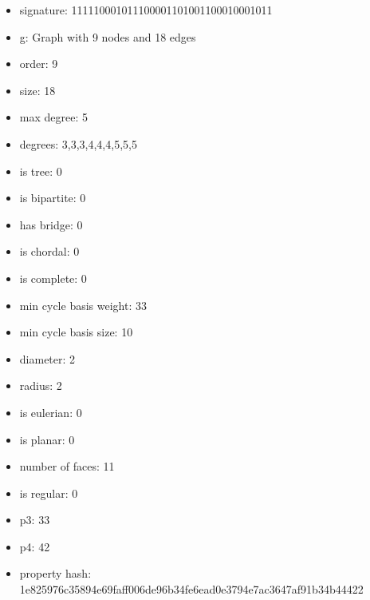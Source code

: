 \newpage
\begin{figure}
\end{figure}
\begin{itemize}
\item signature: 111110001011100001101001100010001011
\item g: Graph with 9 nodes and 18 edges
\item order: 9
\item size: 18
\item max degree: 5
\item degrees: 3,3,3,4,4,4,5,5,5
\item is tree: 0
\item is bipartite: 0
\item has bridge: 0
\item is chordal: 0
\item is complete: 0
\item min cycle basis weight: 33
\item min cycle basis size: 10
\item diameter: 2
\item radius: 2
\item is eulerian: 0
\item is planar: 0
\item number of faces: 11
\item is regular: 0
\item p3: 33
\item p4: 42
\item property hash: 1e825976c35894e69faff006de96b34fe6ead0e3794e7ac3647af91b34b44422
\end{itemize}
